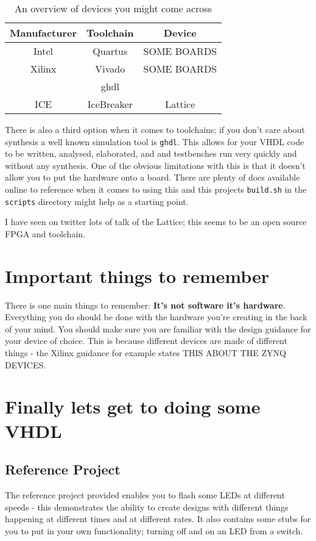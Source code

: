 \documentclass[11pt,a4paper]{article}
\begin{document}
\begin{center}
    \begin{table}
        \begin{tabular}{|c|c|c|}
            \hline
            Manufacturer & Toolchain & Device \\ \hline
            Intel & Quartus & SOME BOARDS \\ \hline
            Xilinx & Vivado & SOME BOARDS \\ \hline
             & ghdl & \\ \hline
            ICE & IceBreaker & Lattice \\ \hline
        \end{tabular}
        \caption{An overview of devices you might come across}
        \label{table:devices}
    \end{table}
\end{center}

There is also a third option when it comes to toolchains; if you don't care about synthesis a well known simulation tool is \texttt{ghdl}. This allows for your VHDL code to be written, analysed, elaborated, and and testbenches run very quickly and without any synthesis. One of the obvious limitations with this is that it doesn't allow you to put the hardware onto a board. There are plenty of docs available online to reference when it comes to using this and this projects \texttt{build.sh} in the \texttt{scripts} directory might help as a starting point.  

I have seen on twitter lots of talk of the Lattice; this seems to be an open source FPGA and toolchain. 

\section{Important things to remember}
There is one main things to remember: \textbf{It's not software it's hardware}. Everything you do should be done with the hardware you're creating in the back of your mind. You should make sure you are familiar with the design guidance for your device of choice. This is because different devices are made of different things - the Xilinx guidance for example states THIS ABOUT THE ZYNQ DEVICES.

\section{Finally lets get to doing some VHDL}
\subsection{Reference Project}
The reference project provided enables you to flash some LEDs at different speeds - this demonstrates the ability to create designs with different things happening at different times and at different rates. It also contains some stubs for you to put in your own functionality; turning off and on an LED from a switch. 
\end{document}
